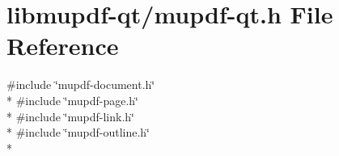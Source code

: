 \hypertarget{mupdf-qt_8h}{\section{libmupdf-\/qt/mupdf-\/qt.h File Reference}
\label{mupdf-qt_8h}
}
{\ttfamily \#include \char`\"{}mupdf-\/document.\-h\char`\"{}}\\*
{\ttfamily \#include \char`\"{}mupdf-\/page.\-h\char`\"{}}\\*
{\ttfamily \#include \char`\"{}mupdf-\/link.\-h\char`\"{}}\\*
{\ttfamily \#include \char`\"{}mupdf-\/outline.\-h\char`\"{}}\\*

